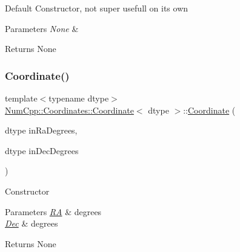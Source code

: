 Default Constructor, not super usefull on its own


\begin{DoxyParams}{Parameters}
{\em None} & \\
\hline
\end{DoxyParams}
\begin{DoxyReturn}{Returns}
None 
\end{DoxyReturn}
\mbox{\label{class_num_cpp_1_1_coordinates_1_1_coordinate_ac26745663fdd7450516d8ee37237a423}} 
\subsubsection{\texorpdfstring{Coordinate()}{Coordinate()}\hspace{0.1cm}{\footnotesize\ttfamily [2/6]}}
{\footnotesize\ttfamily template$<$typename dtype$>$ \\
\mbox{\hyperlink{class_num_cpp_1_1_coordinates_1_1_coordinate}{Num\+Cpp\+::\+Coordinates\+::\+Coordinate}}$<$ dtype $>$\+::\mbox{\hyperlink{class_num_cpp_1_1_coordinates_1_1_coordinate}{Coordinate}} (\begin{DoxyParamCaption}\item[{dtype}]{in\+Ra\+Degrees,  }\item[{dtype}]{in\+Dec\+Degrees }\end{DoxyParamCaption})\hspace{0.3cm}{\ttfamily [inline]}}

Constructor


\begin{DoxyParams}{Parameters}
{\em \mbox{\hyperlink{class_num_cpp_1_1_coordinates_1_1_r_a}{RA}}} & degrees \\
\hline
{\em \mbox{\hyperlink{class_num_cpp_1_1_coordinates_1_1_dec}{Dec}}} & degrees\\
\hline
\end{DoxyParams}
\begin{DoxyReturn}{Returns}
None 
\end{DoxyReturn}
\mbox{\label{class_num_cpp_1_1_coordinates_1_1_coordinate_af52fdaf1bc6730e14f5a415464453a80}} 
